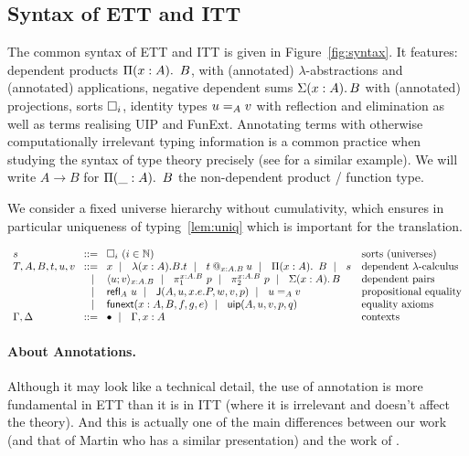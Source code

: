 \subsection{Syntax of ETT and ITT}
\label{sec:ettsyntax}

The common syntax of ETT and ITT is given in Figure~\ref{fig:syntax}.
%
It features: dependent products $\Prod{x:A} B$, with (annotated)
$\lambda$-abstractions and (annotated) applications, negative dependent sums
$\Sum{x:A} B$ with (annotated) projections, sorts $\Ty{i}$, identity types
$\Eq{A}{u}{v}$ with reflection and elimination as well as terms
realising UIP and FunExt. Annotating terms with
otherwise computationally irrelevant typing information is a common
practice when studying the syntax of type theory precisely (see
 for a similar example).
%
We will write $A \to B$ for $\Prod{\_:A} B$ the non-dependent product /
function type.

We consider a fixed universe hierarchy without cumulativity, which
ensures in particular uniqueness of typing~\eqref{lem:uniq} which is
important for the translation.

\begin{figure*}
  \hrulefill
  \[
  \begin{array}{l@{~\,}r@{~\,}l@{\quad}l}
    s &\bnf& \Ty{i} ~(i \in \mathbb{N}) &\mbox{sorts (universes)} \\
    T,A,B,t,u,v &\bnf& x \bnfor \lam{x:A}{B} t \bnfor \app{t}{x:A}{B}{u}
    \bnfor \Prod{x:A} B \bnfor s
    &\mbox{dependent $\lambda$-calculus} \\
    &\bnfor& \pair{x:A}{B}{u}{v} \bnfor \pio{x:A}{B}{p} \bnfor \pit{x:A}{B}{p}
    \bnfor \Sum{x:A} B
    &\mbox{dependent pairs} \\
    &\bnfor& \refl{A} u \bnfor \J{A}{u}{x.e.P}{w}{v}{p} \bnfor \Eq{A}{u}{v}
    &\mbox{propositional equality} \\
    &\bnfor& \funext{x:A}{B}{f}{g}{e} \bnfor \uip{A}{u}{v}{p}{q}
    &\mbox{equality axioms} \\
    \Ga, \D &\bnf& \ctxempty \bnfor \Ga, x:A &\mbox{contexts}
  \end{array}
  \]
  \hrulefill
  \vspace{-2ex}
  \caption{Common syntax of ETT and ITT}
  \label{fig:syntax}
\end{figure*}

\paragraph{About Annotations.}
Although it may look like a technical detail, the use of annotation is more
fundamental in ETT than it is in ITT (where it is irrelevant and doesn't affect
the theory). And this is actually one of the main differences between our work
(and that of Martin  who has a similar
presentation) and the work of .

